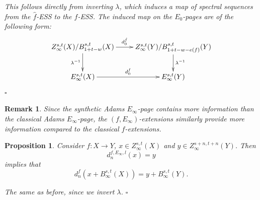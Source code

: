 \documentclass[12pt,a4paper]{article}
\renewenvironment{proof}{{\noindent\it\textbf{Proof}}\quad\it}{\hfill$\square$}
\newtheorem{remark}[equation]{Remark}
\newtheorem{proposition}[equation]{Proposition}
\begin{document}
\begin{sloppy}
\begin{proof}
  This follows directly from inverting $\lambda$, which induces a map of spectral sequences from the $\hat f$-ESS to the $f$-ESS. The induced map on the $E_0$-pages are of the following form:
    $$\xymatrix{
    Z_\infty^{s,t}(X)/B_{1+t-w}^{s,t}(X)\ar[r]^-{d^{\hat f}_0}\ar[d]_{\lambda^{-1}} & Z_\infty^{s,t}(Y)/B_{1+t-w-e(f)}^{s,t}(Y)\ar[d]^{\lambda^{-1}}\\
    E_\infty^{s,t}(X)\ar[r]^-{d^{f}_0} & E_\infty^{s, t}(Y)
    }$$
\end{proof}
\begin{remark}
    Since the synthetic Adams $E_\infty$-page contains more information than the classical Adams $E_\infty$-page, the $(f,E_\infty)$-extensions similarly provide more information compared to the classical $f$-extensions.
\end{remark}

\begin{proposition}
    Consider $f: X\to Y$, $x\in Z_\infty^{s,t}(X)$ and $y\in Z_\infty^{s+n,t+n}(Y)$.
    Then
    $$d^{f,E_\infty, l}_n(x)=y$$
    implies that
    $$d^{f}_n(x+B_\infty^{s,t}(X))=y+B_\infty^{s,t}(Y).$$
\end{proposition}
\begin{proof}
    The same as before, since we invert $\lambda$.
\end{proof}

\end{sloppy}
\end{document}
